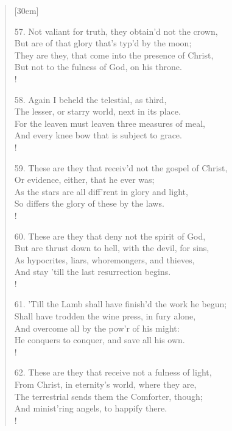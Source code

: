 \begin{verse}[30em]
\begin{altverse}
				57. Not valiant for truth, they obtain'd not the crown, \\ 
				But are of that glory that's typ'd by the moon; \\ 
				They are they, that come into the presence of Christ, \\ 
				But not to the fulness of God, on his throne. \\!
				 
				58. Again I beheld the telestial, as third, \\ 
				The lesser, or starry world, next in its place. \\ 
				For the leaven must leaven three measures of meal, \\ 
				And every knee bow that is subject to grace. \\!
				 
				59. These are they that receiv'd not the gospel of Christ, \\ 
				Or evidence, either, that he ever was; \\ 
				As the stars are all diff'rent in glory and light, \\ 
				So differs the glory of these by the laws. \\!
				 
				60. These are they that deny not the spirit of God, \\ 
				But are thrust down to hell, with the devil, for sins, \\ 
				As hypocrites, liars, whoremongers, and thieves, \\ 
				And stay 'till the last resurrection begins. \\! 
				 
				61. 'Till the Lamb shall have finish'd the work he begun; \\ 
				Shall have trodden the wine press, in fury alone, \\ 
				And overcome all by the pow'r of his might: \\ 
				He conquers to conquer, and save all his own. \\! 
				 
				62. These are they that receive not a fulness of light, \\ 
				From Christ, in eternity's world, where they are, \\ 
				The terrestrial sends them the Comforter, though; \\ 
				And minist'ring angels, to happify there. \\!
				 

\end{altverse}
\end{verse}
